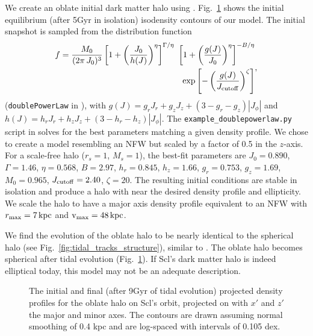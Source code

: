 We create an oblate initial dark matter halo using \agama{}.
Fig.~\ref{fig:oblate_i_f} shows the initial equilibrium (after 5Gyr in
isolation) isodensity contours of our model. The initial snapshot is
sampled from the distribution function \begin{equation}{
\begin{split}
f = \frac{M_0}{(2\pi\,J_0)^3} \left[1 + \left(\frac{J_0}{h(J)}\right)^\eta\right]^{\Gamma / \eta} \ \left[1 + \left(\frac{g(J)}{J_0}\right)^\eta\right]^{-B/\eta} \\ \ \exp\left[-\left(\frac{g(J)}{J_{\rm cutoff}} \right)^\zeta\right] 
\end{split},
}\end{equation} (\texttt{doublePowerLaw} in \agama{}), with
\(g(J) = g_r J_r + g_z J_z + (3-g_r - g_z) |J_\phi|\) and
\(h(J) = h_rJ_r + h_zJ_z + (3-h_r-h_z) |J_\phi|\). The
\texttt{example\_doublepowerlaw.py} script in \agama{} solves for the
best parameters matching a given density profile. We chose to create a
model resembling an NFW but scaled by a factor of 0.5 in the \(z\)-axis.
For a scale-free halo (\(r_s=1\), \(M_s=1\)), the best-fit parameters
are \(J_0=0.890\), \(\Gamma=1.46\), \(\eta=0.568\), \(B=2.97\),
\(h_r=0.845\), \(h_z=1.66\), \(g_r=0.753\), \(g_z=1.69\), \(M_0=0.965\),
\(J_{\rm cutoff}=2.40\), \(\zeta=20\). The resulting initial conditions
are stable in isolation and produce a halo with near the desired density
profile and ellipticity. We scale the halo to have a major axis density
profile equivalent to an NFW with \(r_{\rm max} = 7\,{\rm kpc}\) and
\({\rm v}_{\rm max}=48\,{\rm kpc}\).

We find the evolution of the oblate halo to be nearly identical to the
spherical halo (see Fig.~\ref{fig:tidal_tracks_structure}), similar to
\citet{battaglia+sollima+nipoti2015}. The oblate halo becomes spherical
after tidal evolution (Fig.~\ref{fig:oblate_i_f}). If Scl's dark matter
halo is indeed elliptical today, this model may not be an adequate
description.

\begin{figure}
\centering
{}
\caption[Oblate halo projected density snapshots]{The initial and final
(after 9Gyr of tidal evolution) projected density profiles for the
oblate halo on Scl's \smallperi{} orbit, projected on with \(x'\) and
\(z'\) the major and minor axes. The contours are drawn assuming normal
smoothing of 0.4 kpc and are log-spaced with intervals of 0.105
dex.}\label{fig:oblate_i_f}
\end{figure}


